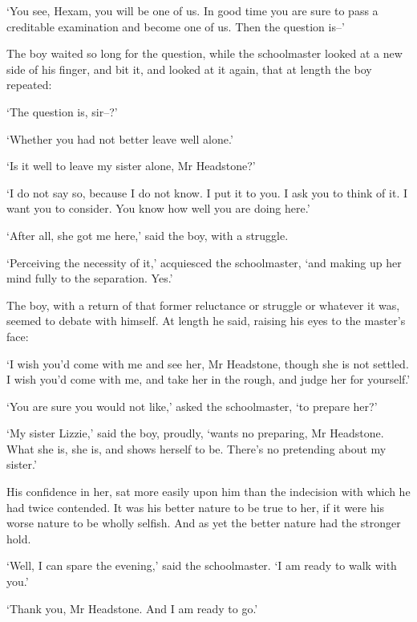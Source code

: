 ‘You see, Hexam, you will be one of us. In good time you are sure to
pass a creditable examination and become one of us. Then the question
is--’

The boy waited so long for the question, while the schoolmaster looked
at a new side of his finger, and bit it, and looked at it again, that at
length the boy repeated:

‘The question is, sir--?’

‘Whether you had not better leave well alone.’

‘Is it well to leave my sister alone, Mr Headstone?’

‘I do not say so, because I do not know. I put it to you. I ask you to
think of it. I want you to consider. You know how well you are doing
here.’

‘After all, she got me here,’ said the boy, with a struggle.

‘Perceiving the necessity of it,’ acquiesced the schoolmaster, ‘and
making up her mind fully to the separation. Yes.’

The boy, with a return of that former reluctance or struggle or whatever
it was, seemed to debate with himself. At length he said, raising his
eyes to the master’s face:

‘I wish you’d come with me and see her, Mr Headstone, though she is not
settled. I wish you’d come with me, and take her in the rough, and judge
her for yourself.’

‘You are sure you would not like,’ asked the schoolmaster, ‘to prepare
her?’

‘My sister Lizzie,’ said the boy, proudly, ‘wants no preparing, Mr
Headstone. What she is, she is, and shows herself to be. There’s no
pretending about my sister.’

His confidence in her, sat more easily upon him than the indecision with
which he had twice contended. It was his better nature to be true to
her, if it were his worse nature to be wholly selfish. And as yet the
better nature had the stronger hold.

‘Well, I can spare the evening,’ said the schoolmaster. ‘I am ready to
walk with you.’

‘Thank you, Mr Headstone. And I am ready to go.’

